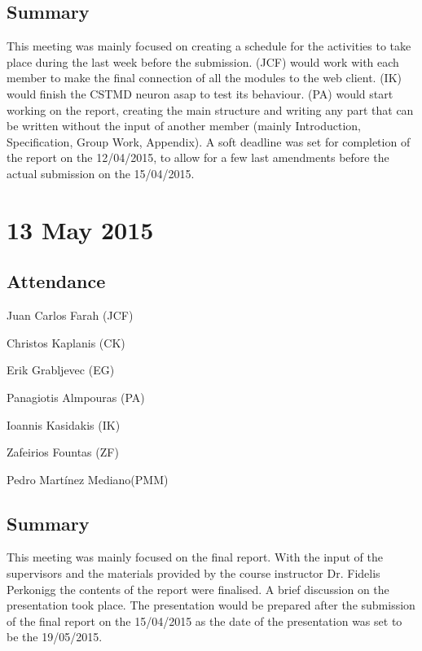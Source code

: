 \documentclass[a4paper,11pt]{article}
\begin{document}
\subsection*{Summary}
This meeting was mainly focused on creating a schedule for the activities to take place during the last week before the submission. (JCF) would work with each member to make the final connection of all the modules to the web client. (IK) would finish the CSTMD neuron asap to test its behaviour. (PA) would start working on the report, creating the main structure and writing any part that can be written without the input of another member (mainly Introduction,  Specification, Group Work, Appendix). A soft deadline was set for completion of the report on the 12/04/2015, to allow for a few last amendments before the actual submission on the 15/04/2015.

\maketitle
\section*{13 May 2015}
\subsection*{Attendance}
\begin{compactenum}
\item Juan Carlos Farah (JCF)
\item Christos Kaplanis (CK)
\item Erik Grabljevec (EG)
\item Panagiotis Almpouras (PA)
\item Ioannis Kasidakis (IK)
\item Zafeirios Fountas (ZF)
\item Pedro Martínez Mediano(PMM)
\end{compactenum}

\subsection*{Summary}
This meeting was mainly focused on the final report. With the input of the supervisors and the materials provided by the course instructor Dr. Fidelis Perkonigg the contents of the report were finalised. A brief discussion on the presentation took place. The presentation would be prepared after the submission of the final report on the 15/04/2015 as the date of the presentation was set to be the 19/05/2015.
\end{document}
